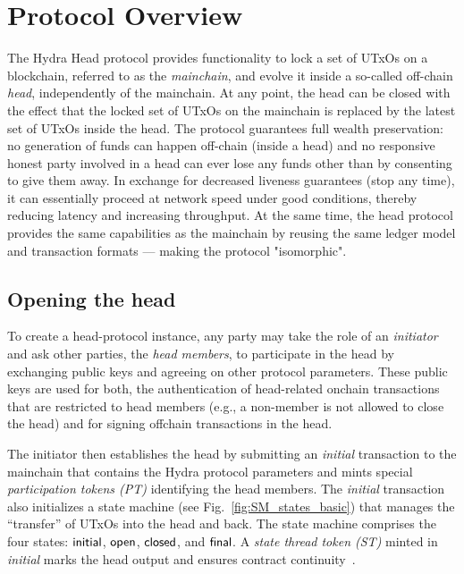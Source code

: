 \section{Protocol Overview}\label{sec:overview}


The Hydra Head protocol provides functionality to lock a set of UTxOs on a
blockchain, referred to as the \emph{mainchain}, and evolve it inside a
so-called off-chain \emph{head}, independently of the mainchain. At any point,
the head can be closed with the effect that the locked set of UTxOs on the
mainchain is replaced by the latest set of UTxOs inside the head. The protocol
guarantees full wealth preservation: no generation of funds can happen off-chain
(inside a head) and no responsive honest party involved in a head can ever lose
any funds other than by consenting to give them away. In exchange for decreased
liveness guarantees (stop any time), it can essentially proceed at network speed
under good conditions, thereby reducing latency and increasing throughput. At the
same time, the head protocol provides the same capabilities as the mainchain by
reusing the same ledger model and transaction formats --- making the protocol
"isomorphic".

\subsection{Opening the head}

To create a head-protocol instance, any party may take the role of an
\emph{initiator} and ask other parties, the \emph{head members}, to participate
in the head by exchanging public keys and agreeing on other protocol parameters.
These public keys are used for both, the authentication of head-related
onchain transactions that are restricted to head members (e.g., a non-member is
not allowed to close the head) and for signing offchain transactions in the head.

The initiator then establishes the head by submitting an \emph{initial}
transaction to the mainchain that contains the Hydra protocol parameters and mints special
\emph{participation tokens (PT)} identifying the head members. The
\emph{initial} transaction also initializes a state machine (see
Fig.~\ref{fig:SM_states_basic}) that manages the ``transfer'' of UTxOs into the
head and back. The state machine comprises the four states: $\mathsf{initial}$,
$\mathsf{open}$, $\mathsf{closed}$, and $\mathsf{final}$. A \emph{state thread token (ST)} minted
in \emph{initial} marks the head output and ensures contract continuity~\cite{eutxo}.

